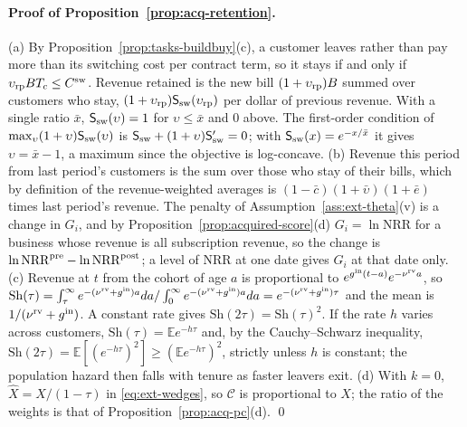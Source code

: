 \paragraph{Proof of Proposition~\ref{prop:acq-retention}.}
(a) By Proposition~\ref{prop:tasks-buildbuy}(c), a customer leaves rather than pay more than its switching cost per contract term, so it stays if and only if $\upsilon_{\rm rp}BT_c\le C^{\rm sw}$. Revenue retained is the new bill $(1+\upsilon_{\rm rp})B$ summed over customers who stay, $(1+\upsilon_{\rm rp})\mathsf S_{\rm sw}(\upsilon_{\rm rp})$ per dollar of previous revenue. With a single ratio $\bar x$, $\mathsf S_{\rm sw}(\upsilon)=1$ for $\upsilon\le\bar x$ and 0 above. The first-order condition of $\max_\upsilon(1+\upsilon)\mathsf S_{\rm sw}(\upsilon)$ is $\mathsf S_{\rm sw}+(1+\upsilon)\mathsf S'_{\rm sw}=0$; with $\mathsf S_{\rm sw}(x)=e^{-x/\bar x}$ it gives $\upsilon=\bar x-1$, a maximum since the objective is log-concave.
(b) Revenue this period from last period's customers is the sum over those who stay of their bills, which by definition of the revenue-weighted averages is $(1-\bar c)(1+\bar\upsilon)(1+\bar e)$ times last period's revenue. The penalty of Assumption~\ref{ass:ext-theta}(v) is a change in $G_i$, and by Proposition~\ref{prop:acquired-score}(d) $G_i=\ln\mathrm{NRR}$ for a business whose revenue is all subscription revenue, so the change is $\ln\mathrm{NRR}^{\rm pre}-\ln\mathrm{NRR}^{\rm post}$; a level of NRR at one date gives $G_i$ at that date only.
(c) Revenue at $t$ from the cohort of age $a$ is proportional to $e^{g^{\rm in}(t-a)}e^{-\nu^{\rm rv}a}$, so $\mathrm{Sh}(\tau)=\int_\tau^\infty e^{-(\nu^{\rm rv}+g^{\rm in})a}da/\int_0^\infty e^{-(\nu^{\rm rv}+g^{\rm in})a}da=e^{-(\nu^{\rm rv}+g^{\rm in})\tau}$ and the mean is $1/(\nu^{\rm rv}+g^{\rm in})$. A constant rate gives $\mathrm{Sh}(2\tau)=\mathrm{Sh}(\tau)^2$. If the rate $h$ varies across customers, $\mathrm{Sh}(\tau)=\mathbb E e^{-h\tau}$ and, by the Cauchy--Schwarz inequality, $\mathrm{Sh}(2\tau)=\mathbb E[(e^{-h\tau})^2]\ge(\mathbb Ee^{-h\tau})^2$, strictly unless $h$ is constant; the population hazard then falls with tenure as faster leavers exit.
(d) With $k=0$, $\hat X=X/(1-\tau)$ in \eqref{eq:ext-wedges}, so $\mathcal C$ is proportional to $X$; the ratio of the weights is that of Proposition~\ref{prop:acq-pc}(d). \qed

